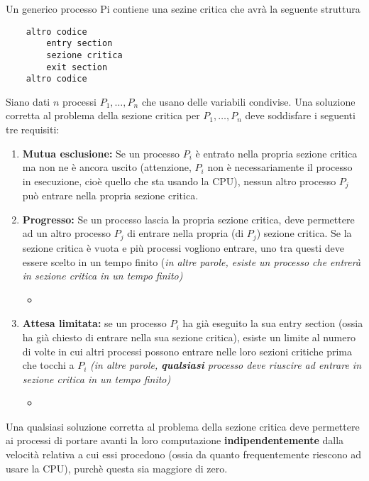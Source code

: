 Un generico processo Pi contiene una sezine critica che avrà la seguente struttura
\begin{verbatim}
    altro codice
        entry section
        sezione critica
        exit section
    altro codice
\end{verbatim}
\bigskip
Siano dati $n$ processi $P_1, \ldots, P_n$ che usano delle variabili condivise. Una soluzione corretta al problema della sezione critica per $P_1, \ldots, P_n$ deve soddisfare i seguenti tre requisiti:

\begin{enumerate}
    \item \textbf{Mutua esclusione:} Se un processo $P_i$ è entrato nella propria sezione critica ma non ne è ancora uscito (attenzione, $P_i$ non è necessariamente il processo in esecuzione, cioè quello che sta usando la CPU), nessun altro processo $P_j$ può entrare nella propria sezione critica.
    \item \textbf{Progresso:} Se un processo lascia la propria sezione critica, deve permettere ad un altro processo $P_j$ di entrare nella propria (di $P_j$) sezione critica. Se la sezione critica è vuota e più processi vogliono entrare, uno tra questi deve essere scelto in un tempo finito (\textit{in altre parole, esiste un processo che entrerà in sezione critica in un tempo finito)}
    \begin{itemize}
        \item {}
    \end{itemize}
    \item \textbf{Attesa limitata:} se un processo $P_i$ ha già eseguito la sua entry section (ossia ha già chiesto di entrare nella sua sezione critica), esiste un limite al numero di volte in cui altri processi possono entrare nelle loro sezioni critiche prima che tocchi a $P_i$ \textit{(in altre parole, \textbf{qualsiasi} processo deve riuscire ad entrare in sezione critica in un tempo finito)}
    \begin{itemize}
        \item {}
    \end{itemize}
\end{enumerate}

Una qualsiasi soluzione corretta al problema della sezione critica deve permettere ai processi di portare avanti la loro computazione \textbf{indipendentemente} dalla velocità relativa a cui essi procedono (ossia da quanto frequentemente riescono ad usare la CPU), purchè questa sia maggiore di zero.

